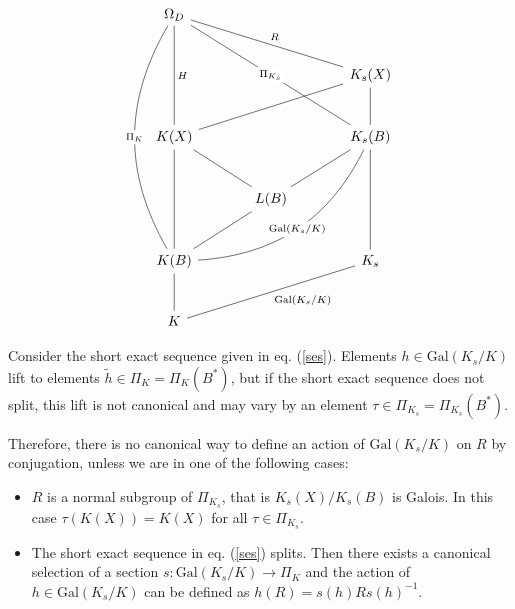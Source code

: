 \documentclass[10pt]{amsart}
\theoremstyle{definition}
\newcommand{\Gal}{{ \mathrm{Gal}}}
\begin{document}
\begin{equation}
\label{eq:diagFF}
\begin{tikzcd}[row sep=large, column sep=large]
\Omega_D \arrow[ddrr, no head, "\Pi_{K_s}" description, crossing over] \arrow[drr, no head, "R"]  \arrow[dd, no head, "H"]
\arrow[dddd, no head, bend right, "\Pi_{K}" description] \\ 
& &  K_s(X) \arrow[d,no head] \arrow[dll,no head] 
\\
K(X) \arrow[dd,no head] &  & K_s(B) \arrow[ddll,no head,bend left, "\Gal(K_s/K)" description] \arrow[dd,no head] \\
& L(B) \arrow[ul,no head] \arrow[ur, no head] \arrow[dl,no head] &\\
K(B) \arrow[d,no head]  &  &  K_s \arrow[dll,no head,"\Gal(K_s/K)"]\\
K & & 
\end{tikzcd}
\end{equation}


Consider the short exact sequence given in eq. (\ref{ses}). 
Elements  $h\in \Gal(K_s/K)$ lift  to elements $\tilde{h} \in \Pi_{K}=\Pi_{K}(B^*)$, but if the short exact sequence does not split, this lift is not canonical and may vary by an element $\tau\in \Pi_{K_s}=\Pi_{K_s}(B^*)$. 

Therefore, there is no canonical way to define an action of $\Gal(K_s/K)$ on $R$ by conjugation, unless we are in one of the following cases:

\begin{itemize}
    \item  $R$ is a normal subgroup of $\Pi_{K_s}$, that is $K_s(X)/K_s(B)$ is Galois. In this case $\tau(K(X))=K(X)$ for all $\tau \in \Pi_{K_s}$.
    \item The short exact sequence in eq. (\ref{ses}) splits. Then there exists a canonical selection of a section $s\colon \Gal(K_s/K) \rightarrow \Pi_{K}$ and the action of $h \in \Gal(K_s/K)$ can be defined as $h(R)=s(h) R s(h)^{-1}$. 
\end{itemize}
\end{document}
